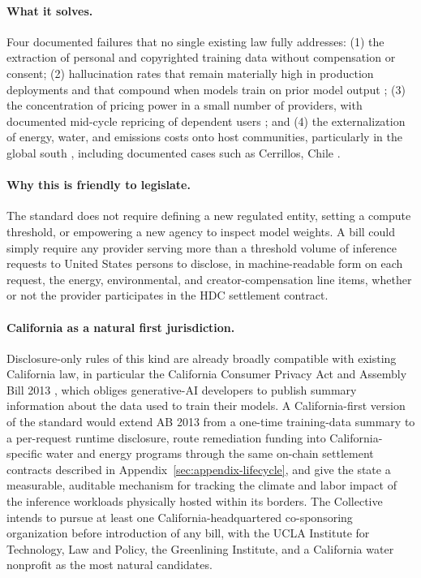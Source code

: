 \documentclass[10pt,a4paper,twocolumn]{article}
\begin{document}
\paragraph{What it solves.} Four documented failures that no single existing law fully addresses: (1) the extraction of personal and copyrighted training data without compensation or consent; (2) hallucination rates that remain materially high in production deployments and that compound when models train on prior model output \citep{openai2024gpt4osystemcard,kalai2025whyhallucinate,shumailov2024modelcollapse}; (3) the concentration of pricing power in a small number of providers, with documented mid-cycle repricing of dependent users \citep{anthropic2026opus47,github2026opus47,vscode2026opus47issue}; and (4) the externalization of energy, water, and emissions costs onto host communities, particularly in the global south \citep{strubell2019energy,iied2024ramos}, including documented cases such as Cerrillos, Chile \citep[ch.~12]{hao2025empire}.

\paragraph{Why this is friendly to legislate.} The standard does not require defining a new regulated entity, setting a compute threshold, or empowering a new agency to inspect model weights. A bill could simply require any provider serving more than a threshold volume of inference requests to United States persons to disclose, in machine-readable form on each request, the energy, environmental, and creator-compensation line items, whether or not the provider participates in the HDC settlement contract.

\paragraph{California as a natural first jurisdiction.} Disclosure-only rules of this kind are already broadly compatible with existing California law, in particular the California Consumer Privacy Act \citep{ccpa2018} and Assembly Bill 2013 \citep{ab2013ca}, which obliges generative-AI developers to publish summary information about the data used to train their models. A California-first version of the standard would extend AB 2013 from a one-time training-data summary to a per-request runtime disclosure, route remediation funding into California-specific water and energy programs through the same on-chain settlement contracts described in Appendix~\ref{sec:appendix-lifecycle}, and give the state a measurable, auditable mechanism for tracking the climate and labor impact of the inference workloads physically hosted within its borders. The Collective intends to pursue at least one California-headquartered co-sponsoring organization before introduction of any bill, with the UCLA Institute for Technology, Law and Policy, the Greenlining Institute, and a California water nonprofit as the most natural candidates.
\end{document}
